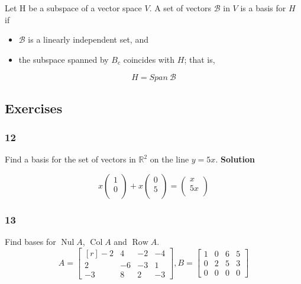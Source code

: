   \begin{mydef}
    Let H be a subspace of a vector space $ V $. A set of vectors $ \mathcal{B} $ in $ V $ is a basis for $ H $ if 
    \begin{itemize}
    \item  $ \mathcal{B} $ is a linearly independent set, and 
    \item the subspace spanned by $ B_c $ coincides with $ H $; that is, 
    \end{itemize}
    \[
    H = Span \ \mathcal{B}
    \]
  \end{mydef}

  \subsection*{Exercises}
    \subsubsection*{12}
      Find a basis for the set of vectors in $ \mathbb{R}^{2}  $ on the line $ y = 5x  $. \newline \newline 
      \bf{Solution} \newline \newline 

      \[
      x \begin{pmatrix} 1 \\ 0 \\\end{pmatrix} + 
      x \begin{pmatrix} 0 \\ 5 \\\end{pmatrix} = \begin{pmatrix} x \\ 5x \\\end{pmatrix}
      \]
    
    \subsubsection*{13}
      Find bases for $ \operatorname{Nul}A $, $ \operatorname{Col}A $ and $ \operatorname{Row}A $. 
      \[
      A = 
      \begin{bmatrix*}[r]
       -2 & 4 & -2 & -4 \\
       2 & -6 & -3 & 1 \\
       -3 & 8 & 2 & -3 
      \end{bmatrix*}, 
      B = 
      \begin{bmatrix}
       1 & 0 & 6 & 5 \\
       0 & 2 & 5 & 3 \\
       0 & 0 & 0 & 0
      \end{bmatrix}
      \]
      
